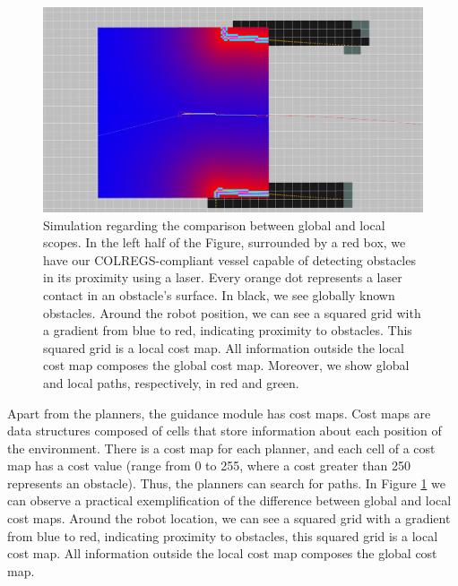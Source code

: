          \begin{figure}[H]
            \centering
            \includegraphics[scale=0.35]{figs/Chap4/reduced_localCostMap2.png}
            \caption{Simulation regarding the comparison between global and local scopes. In the left half of the Figure, surrounded by a red box, we have our \ac{COLREGS}-compliant vessel capable of detecting obstacles in its proximity using a laser. Every orange dot represents a laser contact in an obstacle's surface. In black, we see globally known obstacles.  Around the robot position, we can see a squared grid with a gradient from blue to red, indicating proximity to obstacles. This squared grid is a local cost map. All information outside the local cost map composes the global cost map. Moreover, we show global and local paths, respectively, in red and green.}
            \label{fig:costmaps}
        \end{figure}
        
        Apart from the planners, the guidance module has cost maps. Cost maps are data structures composed of cells that store information about each position of the environment. There is a cost map for each planner, and each cell of a cost map has a cost value (range from 0 to 255, where a cost greater than 250 represents an obstacle). Thus, the planners can search for paths. In Figure \ref{fig:costmaps} we can observe a practical exemplification of the difference between global and local cost maps. Around the robot location, we can see a squared grid with a gradient from blue to red, indicating proximity to obstacles, this squared grid is a local cost map. All information outside the local cost map composes the global cost map.
        
